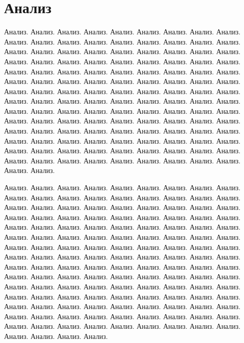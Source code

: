 \section{Анализ}

Анализ. Анализ. Анализ. Анализ. Анализ. Анализ. Анализ. Анализ. Анализ. Анализ. Анализ. 
Анализ. Анализ. Анализ. Анализ. Анализ. 
Анализ. Анализ. Анализ. Анализ. Анализ. Анализ. Анализ. Анализ. Анализ. Анализ. Анализ. 
Анализ. Анализ. Анализ. Анализ. Анализ. 
Анализ. Анализ. Анализ. Анализ. Анализ. Анализ. Анализ. Анализ. Анализ. Анализ. Анализ. 
Анализ. Анализ. Анализ. Анализ. Анализ. 
Анализ. Анализ. Анализ. Анализ. Анализ. Анализ. Анализ. Анализ. Анализ. Анализ. Анализ. 
Анализ. Анализ. Анализ. Анализ. Анализ. 
Анализ. Анализ. Анализ. Анализ. Анализ. Анализ. Анализ. Анализ. Анализ. Анализ. Анализ. 
Анализ. Анализ. Анализ. Анализ. Анализ. 
Анализ. Анализ. Анализ. Анализ. Анализ. Анализ. Анализ. Анализ. Анализ. Анализ. Анализ. 
Анализ. Анализ. Анализ. Анализ. Анализ. 
Анализ. Анализ. Анализ. Анализ. Анализ. Анализ. Анализ. Анализ. Анализ. Анализ. Анализ. 
Анализ. Анализ. Анализ. Анализ. Анализ. 
Анализ. Анализ. Анализ. Анализ. Анализ. Анализ. Анализ. Анализ. Анализ. Анализ. Анализ. 
Анализ. Анализ. Анализ. Анализ. Анализ. 

Анализ. Анализ. Анализ. Анализ. Анализ. Анализ. Анализ. Анализ. Анализ. Анализ. Анализ. 
Анализ. Анализ. Анализ. Анализ. Анализ. 
Анализ. Анализ. Анализ. Анализ. Анализ. Анализ. Анализ. Анализ. Анализ. Анализ. Анализ. 
Анализ. Анализ. Анализ. Анализ. Анализ. 
Анализ. Анализ. Анализ. Анализ. Анализ. Анализ. Анализ. Анализ. Анализ. Анализ. Анализ. 
Анализ. Анализ. Анализ. Анализ. Анализ. 
Анализ. Анализ. Анализ. Анализ. Анализ. Анализ. Анализ. Анализ. Анализ. Анализ. Анализ. 
Анализ. Анализ. Анализ. Анализ. Анализ. 
Анализ. Анализ. Анализ. Анализ. Анализ. Анализ. Анализ. Анализ. Анализ. Анализ. Анализ. 
Анализ. Анализ. Анализ. Анализ. Анализ. 
Анализ. Анализ. Анализ. Анализ. Анализ. Анализ. Анализ. Анализ. Анализ. Анализ. Анализ. 
Анализ. Анализ. Анализ. Анализ. Анализ. 
Анализ. Анализ. Анализ. Анализ. Анализ. Анализ. Анализ. Анализ. Анализ. Анализ. Анализ. 
Анализ. Анализ. Анализ. Анализ. Анализ. 
Анализ. Анализ. Анализ. Анализ. Анализ. Анализ. Анализ. Анализ. Анализ. Анализ. Анализ. 
Анализ. Анализ. Анализ. Анализ. Анализ. 
Анализ. Анализ. Анализ. Анализ. Анализ. Анализ. Анализ. Анализ. Анализ. Анализ. Анализ. 

